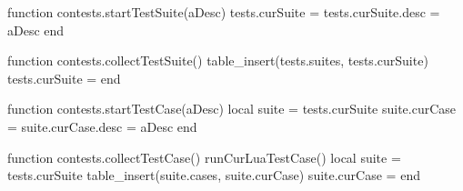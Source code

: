 
\startchapter[title=Unit Test Suites]

\def\startTestSuite[#1]{%
  \startsubsection[title=#1]
}

\def\stopTestSuite{%
  \stopsubsection%
}

\def\startTestCase[#1]{%
  \startsubsubsection[title=#1]
}

\def\stopTestCase{%
  \stopsubsubsection%
}

\startMkIVCode

\def\startTestSuite[#1]{%
  \startsubsection[title=#1]
  \directlua{thirddata.contests.startTestSuite('#1')}
}

\def\stopTestSuite{%
  \stopsubsection%
  \directlua{thirddata.contests.collectTestSuite()}
}

\def\startTestCase[#1]{%
  \startsubsubsection[title=#1]
  \directlua{thirddata.contests.startTestCase('#1')}
}

\def\stopTestCase{%
  \stopsubsubsection%
  \directlua{thirddata.contests.collectTestCase()}
}

\stopMkIVCode

\startLuaCode

function contests.startTestSuite(aDesc)
  tests.curSuite      = {}
  tests.curSuite.desc = aDesc
end

function contests.collectTestSuite()
  table_insert(tests.suites, tests.curSuite)
  tests.curSuite = {}
end

function contests.startTestCase(aDesc)
  local suite = tests.curSuite
  suite.curCase = {}
  suite.curCase.desc = aDesc
end

function contests.collectTestCase()
  runCurLuaTestCase()
  local suite = tests.curSuite
  table_insert(suite.cases, suite.curCase)
  suite.curCase = {}
end

\stopLuaCode

\stopchapter